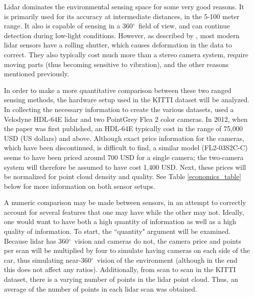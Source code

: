 \def \deg {$ ^{\circ}$\ } %
Lidar dominates the environmental sensing space for some very good reasons. It is primarily used for its accuracy at intermediate distances, in the 5-100 meter range. It also is capable of sensing in a 360\deg field of view, and can continue detection during low-light conditions. However, as described by \cite{broggi_sensors_2013}, most modern lidar sensors have a rolling shutter, which causes deformation in the data to correct. They also typically cost much more than a stereo camera system, require moving parts (thus becoming sensitive to vibration), and the other reasons mentioned previously.

In order to make a more quantitative comparison between these two ranged sensing methods, the hardware setup used in the KITTI dataset will be analyzed. In collecting the necessary information to create the various datasets, \cite{geiger_are_2012} used a Velodyne HDL-64E lidar and two PointGrey Flea 2 color cameras. In 2012, when the paper was first published, an HDL-64E typically cost in the range of 75,000 USD (US dollars) and above. %
Although exact price information for the cameras, which have been discontinued, is difficult to find, a similar model (FL2-03S2C-C) seems to have been priced around 700 USD for a single camera; the two-camera system will therefore be assumed to have cost 1,400 USD. %
Next, these prices will be normalized for point cloud density and quality. See Table \ref{economics_table} below for more information on both sensor setups.

A numeric comparison may be made between sensors, in an attempt to correctly account for several features that one may have while the other may not. Ideally, one would want to have both a high quantity of information as well as a high quality of information. To start, the ``quantity" argument will be examined. Because lidar has 360\deg vision and cameras do not, the camera price and points per scan will be multiplied by four to simulate having cameras on each side of the car, thus simulating near-360\deg vision of the environment (although in the end this does not affect any ratios). Additionally, from scan to scan in the KITTI dataset, there is a varying number of points in the lidar point cloud. Thus, an average of the number of points in each lidar scan was obtained.

